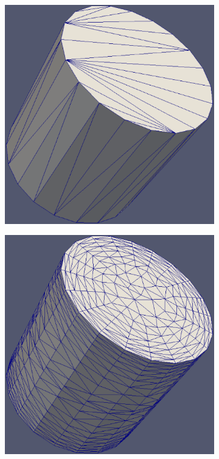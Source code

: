 \documentclass[conf]{new-aiaa}
\begin{document}
\begin{figure}[hbt!]
\centering
\begin{subfigure}{.5\textwidth}
  \centering
  \includegraphics[width=.9\linewidth]{cylinder/coarse/cyl-coarse.eps}
  \caption{}
  \label{cyl-coarse}
\end{subfigure}%
\begin{subfigure}{.5\textwidth}
  \centering
  \includegraphics[width=.9\linewidth]{cylinder/coarse/cyl-coarse-mesh.eps}

\end{subfigure}
\end{figure}
\end{document}
